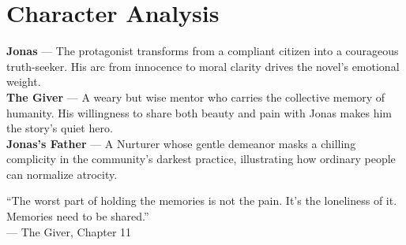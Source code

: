 \section{Character Analysis}

{\color{accent}\bfseries Jonas} --- The protagonist transforms from a compliant citizen into a courageous truth-seeker. His arc from innocence to moral clarity drives the novel's emotional weight.\\[2pt]
{\color{accent}\bfseries The Giver} --- A weary but wise mentor who carries the collective memory of humanity. His willingness to share both beauty and pain with Jonas makes him the story's quiet hero.\\[2pt]
{\color{accent}\bfseries Jonas's Father} --- A Nurturer whose gentle demeanor masks a chilling complicity in the community's darkest practice, illustrating how ordinary people can normalize atrocity.

\vspace{6pt}

\begin{quotebox}
    ``The worst part of holding the memories is not the pain. It's the loneliness of it. Memories need to be shared.''\\[2pt]
    {\normalfont\color{accent}--- The Giver, Chapter 11}
\end{quotebox}

\vspace{6pt}

